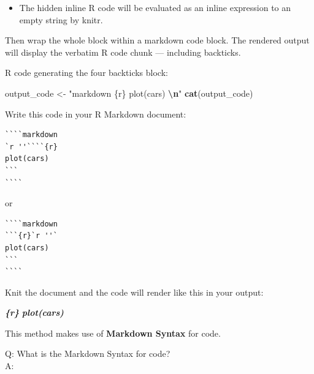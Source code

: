 \documentclass[
  a4paper,
  twoside,
  openright]{book}
\newenvironment{Shaded}{\begin{snugshade}}{\end{snugshade}}
\newcommand{\FunctionTok}[1]{\textcolor[rgb]{0.13,0.29,0.53}{\textbf{#1}}}
\newcommand{\InformationTok}[1]{\textcolor[rgb]{0.56,0.35,0.01}{\textbf{\textit{#1}}}}
\newcommand{\NormalTok}[1]{#1}
\newcommand{\OtherTok}[1]{\textcolor[rgb]{0.56,0.35,0.01}{#1}}
\newcommand{\SpecialCharTok}[1]{\textcolor[rgb]{0.81,0.36,0.00}{\textbf{#1}}}
\newcommand{\StringTok}[1]{\textcolor[rgb]{0.31,0.60,0.02}{#1}}
\providecommand{\tightlist}{%
  \setlength{\itemsep}{0pt}\setlength{\parskip}{0pt}}
\theoremstyle{definition}
\theoremstyle{definition}
\theoremstyle{definition}
\theoremstyle{definition}
\theoremstyle{remark}
\begin{document}
\begin{itemize}
\tightlist
\item
  The hidden inline R code will be evaluated as an inline expression to an empty string by knitr.
\end{itemize}

Then wrap the whole block within a markdown code block. The rendered output will display the verbatim R code chunk --- including backticks.

R code generating the four backticks block:

\begin{Shaded}
\begin{Highlighting}[]
\NormalTok{output\_code }\OtherTok{\textless{}{-}}
\StringTok{"\textasciigrave{}\textasciigrave{}\textasciigrave{}\textasciigrave{}markdown}
\StringTok{\textasciigrave{}\textasciigrave{}\textasciigrave{}\{r\}}
\StringTok{plot(cars)}
\StringTok{\textasciigrave{}\textasciigrave{}\textasciigrave{} }\SpecialCharTok{\textbackslash{}n}\StringTok{\textasciigrave{}\textasciigrave{}\textasciigrave{}\textasciigrave{}"}
\FunctionTok{cat}\NormalTok{(output\_code)}
\end{Highlighting}
\end{Shaded}

Write this code in your R Markdown document:

\begin{verbatim}
````markdown
`r ''````{r}
plot(cars)
``` 
````
\end{verbatim}

or

\begin{verbatim}
````markdown
```{r}`r ''`
plot(cars)
``` 
````
\end{verbatim}

Knit the document and the code will render like this in your output:

\begin{Shaded}
\begin{Highlighting}[]
\InformationTok{\textasciigrave{}\textasciigrave{}\textasciigrave{}\{r\}}
\InformationTok{plot(cars)}
\InformationTok{\textasciigrave{}\textasciigrave{}\textasciigrave{}}
\end{Highlighting}
\end{Shaded}

This method makes use of \textbf{Markdown Syntax} for code.

Q: What is the Markdown Syntax for code?\\
A:
\end{document}
